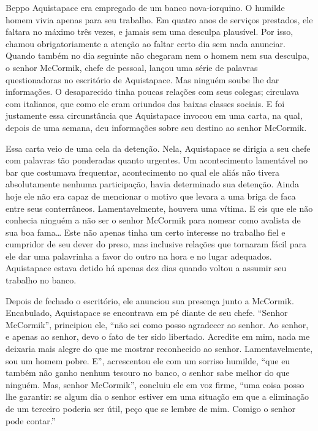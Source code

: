 Beppo Aquistapace era empregado de um banco nova-iorquino. O humilde
homem vivia apenas para seu trabalho. Em quatro anos de serviços
prestados, ele faltara no máximo três vezes, e jamais sem uma desculpa
plausível. Por isso, chamou obrigatoriamente a atenção ao faltar certo
dia sem nada anunciar. Quando também no dia seguinte não chegaram nem o
homem nem sua desculpa, o senhor McCormik, chefe de pessoal, lançou uma
série de palavras questionadoras no escritório de Aquistapace. Mas
ninguém soube lhe dar informações. O desaparecido tinha poucas relações
com seus colegas; circulava com italianos, que como ele eram oriundos
das baixas classes sociais. E foi justamente essa circunstância que
Aquistapace invocou em uma carta, na qual, depois de uma semana, deu
informações sobre seu destino ao senhor McCormik.

Essa carta veio de uma cela da detenção. Nela, Aquistapace se dirigia a
seu chefe com palavras tão ponderadas quanto urgentes. Um acontecimento
lamentável no bar que costumava frequentar, acontecimento no qual ele
aliás não tivera absolutamente nenhuma participação, havia determinado
sua detenção. Ainda hoje ele não era capaz de mencionar o motivo que
levara a uma briga de faca entre seus conterrâneos. Lamentavelmente,
houvera uma vítima. E eis que ele não conhecia ninguém a não ser o
senhor McCormik para nomear como avalista de sua boa fama\ldots{} Este não
apenas tinha um certo interesse no trabalho fiel e cumpridor de seu
dever do preso, mas inclusive relações que tornaram fácil para ele dar
uma palavrinha a favor do outro na hora e no lugar adequados.
Aquistapace estava detido há apenas dez dias quando voltou a assumir seu
trabalho no banco.

Depois de fechado o escritório, ele anunciou sua presença junto a
McCormik. Encabulado, Aquistapace se encontrava em pé diante de seu
chefe. ``Senhor McCormik'', principiou ele, ``não sei como posso
agradecer ao senhor. Ao senhor, e apenas ao senhor, devo o fato de ter
sido libertado. Acredite em mim, nada me deixaria mais alegre do que me
mostrar reconhecido ao senhor. Lamentavelmente, sou um homem pobre. E'',
acrescentou ele com um sorriso humilde, ``que eu também não ganho nenhum
tesouro no banco, o senhor sabe melhor do que ninguém. Mas, senhor
McCormik'', concluiu ele em voz firme, ``uma coisa posso lhe garantir:
se algum dia o senhor estiver em uma situação em que a eliminação de um
terceiro poderia ser útil, peço que se lembre de mim. Comigo o senhor
pode contar.''




